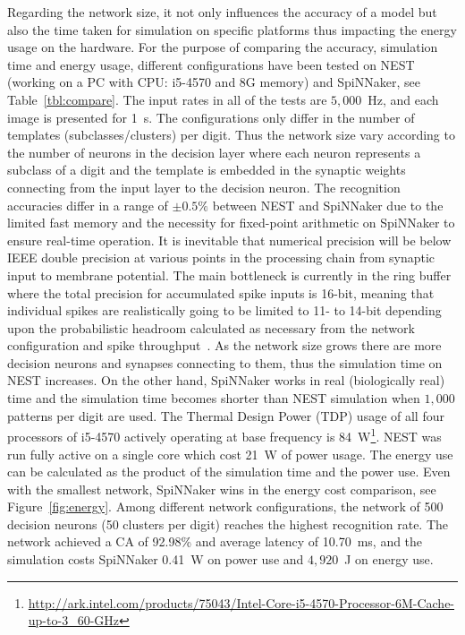 \documentclass{frontiersENG} %
\begin{document}
Regarding the network size, it not only influences the accuracy of a model but also the time taken for simulation on specific platforms thus impacting the energy usage on the hardware.
For the purpose of comparing the accuracy, simulation time and energy usage, different configurations have been tested on NEST (working on a PC with CPU: i5-4570 and 8G memory) and SpiNNaker, see Table~\ref{tbl:compare}.
The input rates in all of the tests are $5,000$~Hz, and each image is presented for 1~s.
The configurations only differ in the number of templates (subclasses/clusters) per digit.
Thus the network size vary according to the number of neurons in the decision layer where each neuron represents a subclass of a digit and the template is embedded in the synaptic weights connecting from the input layer to the decision neuron.
The recognition accuracies differ in a range of $\pm0.5\%$ between NEST and SpiNNaker due to the limited fast memory and the necessity for fixed-point arithmetic on SpiNNaker to ensure real-time operation.
It is inevitable that numerical precision will be below IEEE double precision at various points in the processing chain from synaptic input to membrane potential.
The main bottleneck is currently in the ring buffer where the total precision for accumulated spike inputs is 16-bit, meaning that individual spikes are realistically going to be limited to 11- to 14-bit depending upon the probabilistic headroom calculated as necessary from the network configuration and spike throughput~\citep{Hopkins2015Accuracy}.
As the network size grows there are more decision neurons and synapses connecting to them, thus the simulation time on NEST increases.
On the other hand, SpiNNaker works in real (biologically real) time and the simulation time becomes shorter than NEST simulation when $1,000$ patterns per digit are used.
The Thermal Design Power (TDP) usage of all four processors of i5-4570 actively operating at base frequency is 84~W\footnote{\url{http://ark.intel.com/products/75043/Intel-Core-i5-4570-Processor-6M-Cache-up-to-3_60-GHz}}.
NEST was run fully active on a single core which cost 21~W of power usage.
The energy use can be calculated as the product of the simulation time and the power use.
Even with the smallest network, SpiNNaker wins in the energy cost comparison, see Figure~\ref{fig:energy}.
Among different network configurations, the network of 500 decision neurons (50 clusters per digit) reaches the highest recognition rate.
The network achieved a CA of 92.98\% and average latency of 10.70~ms, and the simulation costs SpiNNaker 0.41~W on power use and $4,920$~J on energy use.
\end{document}
